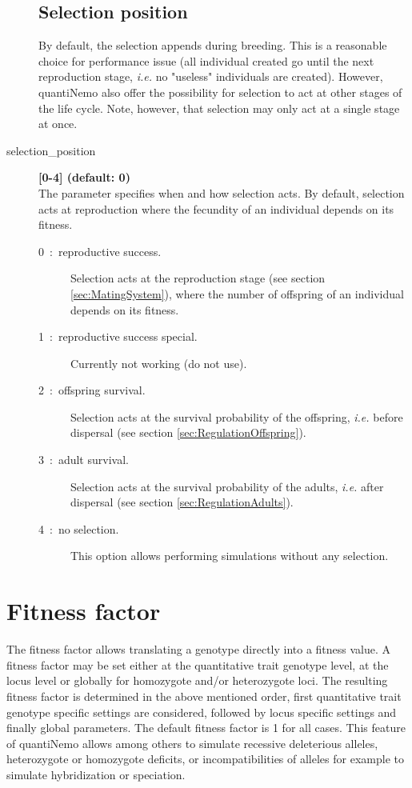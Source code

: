 \documentclass[letterpaper,12pt,oneside]{book}
\begin{document}
\begin{description}
\subsection{Selection position}
By default, the selection appends during breeding. This is a reasonable choice for performance issue (all individual created go until the next reproduction stage, \textit{i.e.} no "useless" individuals are created). However, quantiNemo also offer the possibility for selection to act at other stages of the life cycle. Note, however, that selection may only act at a single stage at once. 
\item[selection\_position\index{selection\_position}] \textbf{[0-4] (default: 0)}\\
The parameter specifies when and how selection acts. By default, selection acts at reproduction where the fecundity of an individual depends on its fitness.
\begin{description}
\item [0~:~reproductive success.] Selection acts at the reproduction stage (see section \ref{sec:MatingSystem}), where the number of offspring of an individual depends on its fitness.
\item [1~:~reproductive success special.] Currently not working (do not use). 
\item [2~:~offspring survival.] Selection acts at the survival probability of the offspring, \textit{i.e.} before dispersal (see section \ref{sec:RegulationOffspring}).
\item [3~:~adult survival.] Selection acts at the survival probability of the adults, \textit{i.e.} after dispersal (see section \ref{sec:RegulationAdults}).
\item [4~:~no selection.] This option allows performing simulations without any selection.
\end{description}


\end{description}

\section{Fitness factor}
\label{sec:FitnessFactor}
The fitness factor allows translating a genotype directly into a fitness value. A fitness factor may be set either at the quantitative trait genotype level, at the locus level or globally for homozygote and/or heterozygote loci. The resulting fitness factor is determined in the above mentioned order, first quantitative trait genotype specific settings are considered, followed by locus specific settings and finally global parameters. The default fitness factor is 1 for all cases. This feature of quantiNemo allows among others to simulate recessive deleterious alleles, heterozygote or homozygote deficits, or incompatibilities of alleles for example to simulate hybridization or speciation. 
\end{document}
